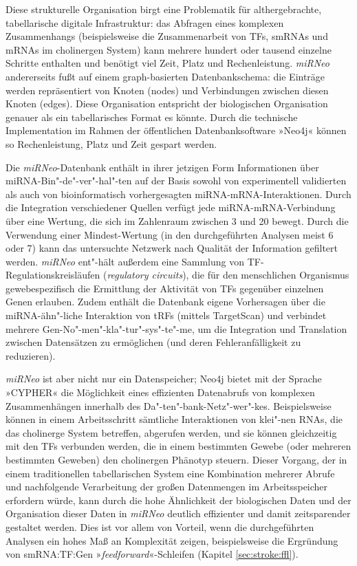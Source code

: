 Diese strukturelle Organisation birgt eine Problematik für althergebrachte, tabellarische digitale Infrastruktur: das Abfragen eines komplexen Zusammenhangs (beispielsweise die Zusammenarbeit von TFs, smRNAs und mRNAs im cholinergen System) kann mehrere hundert oder tausend einzelne Schritte enthalten und benötigt viel Zeit, Platz und Rechenleistung. \emph{miRNeo} andererseits fußt auf einem graph-basierten Datenbankschema: die Einträge werden repräsentiert von Knoten (nodes) und Verbindungen zwischen diesen Knoten (edges). Diese Organisation entspricht der biologischen Organisation genauer als ein tabellarisches Format es könnte. Durch die technische Implementation im Rahmen der öffentlichen Datenbanksoftware »Neo4j« können so Rechenleistung, Platz und Zeit gespart werden.

Die \emph{miRNeo}-Datenbank enthält in ihrer jetzigen Form Informationen über miRNA-Bin"-de"-ver"-hal"-ten auf der Basis sowohl von experimentell validierten als auch von bioinformatisch vorhergesagten miRNA-mRNA-Interaktionen. Durch die Integration verschiedener Quellen verfügt jede miRNA-mRNA-Verbindung über eine Wertung, die sich im Zahlenraum zwischen 3 und 20 bewegt. Durch die Verwendung einer Mindest-Wertung (in den durchgeführten Analysen meist 6 oder 7) kann das untersuchte Netzwerk nach Qualität der Information gefiltert werden. \emph{miRNeo} ent"-hält außerdem eine Sammlung von TF-Regulationskreisläufen (\emph{regulatory circuits}), die für den menschlichen Organismus gewebespezifisch die Ermittlung der Aktivität von TFs gegenüber einzelnen Genen erlauben. Zudem enthält die Datenbank eigene Vorhersagen über die miRNA-ähn"-liche Interaktion von tRFs (mittels TargetScan) und verbindet mehrere Gen-No"-men"-kla"-tur"-sys"-te"-me, um die Integration und Translation zwischen Datensätzen zu ermöglichen (und deren Fehleranfälligkeit zu reduzieren).

\emph{miRNeo} ist aber nicht nur ein Datenspeicher; Neo4j bietet mit der Sprache »CYPHER« die Möglichkeit eines effizienten Datenabrufs von komplexen Zusammenhängen innerhalb des Da"-ten"-bank-Netz"-wer"-kes. Beispielsweise können in einem Arbeitsschritt sämtliche Interaktionen von klei"-nen RNAs, die das cholinerge System betreffen, abgerufen werden, und sie können gleichzeitig mit den TFs verbunden werden, die in einem bestimmten Gewebe (oder mehreren bestimmten Geweben) den cholinergen Phänotyp steuern. Dieser Vorgang, der in einem traditionellen tabellarischen System eine Kombination mehrerer Abrufe und nachfolgende Verarbeitung der großen Datenmengen im Arbeitsspeicher erfordern würde, kann durch die hohe Ähnlichkeit der biologischen Daten und der Organisation dieser Daten in \emph{miRNeo} deutlich effizienter und damit zeitsparender gestaltet werden. Dies ist vor allem von Vorteil, wenn die durchgeführten Analysen ein hohes Maß an Komplexität zeigen, beispielsweise die Ergründung von smRNA:TF:Gen »\emph{feedforward}«-Schleifen (Kapitel \ref{sec:stroke:ffl}).

